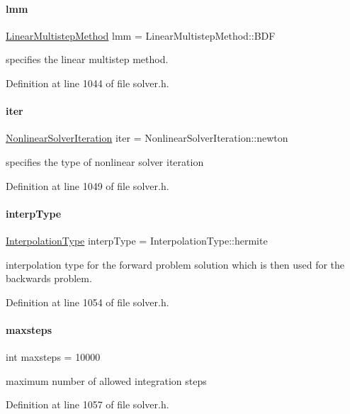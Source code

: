 \paragraph{\texorpdfstring{lmm}{lmm}}
{\footnotesize\ttfamily \mbox{\hyperlink{namespaceamici_a9ebe272482a8e073efe7078b7e96e8bc}{Linear\+Multistep\+Method}} lmm = Linear\+Multistep\+Method\+::\+B\+DF\hspace{0.3cm}{\ttfamily [protected]}}

specifies the linear multistep method. 

Definition at line 1044 of file solver.\+h.

\mbox{\label{classamici_1_1_solver_a0ef59d3f746d2ec0e3f126b7b9989f50}} 
\paragraph{\texorpdfstring{iter}{iter}}
{\footnotesize\ttfamily \mbox{\hyperlink{namespaceamici_a13388d34e4c35bb592c3e821c35cc923}{Nonlinear\+Solver\+Iteration}} iter = Nonlinear\+Solver\+Iteration\+::newton\hspace{0.3cm}{\ttfamily [protected]}}

specifies the type of nonlinear solver iteration 

Definition at line 1049 of file solver.\+h.

\mbox{\label{classamici_1_1_solver_a5a80193af5ca74a4a4e3da67a7e74a98}} 
\paragraph{\texorpdfstring{interp\+Type}{interpType}}
{\footnotesize\ttfamily \mbox{\hyperlink{namespaceamici_a8472f01c511d77bbfb981a46618ea1ea}{Interpolation\+Type}} interp\+Type = Interpolation\+Type\+::hermite\hspace{0.3cm}{\ttfamily [protected]}}

interpolation type for the forward problem solution which is then used for the backwards problem. 

Definition at line 1054 of file solver.\+h.

\mbox{\label{classamici_1_1_solver_a029415ebe024ac6281fd9f190aefb2ee}} 
\paragraph{\texorpdfstring{maxsteps}{maxsteps}}
{\footnotesize\ttfamily int maxsteps = 10000\hspace{0.3cm}{\ttfamily [protected]}}

maximum number of allowed integration steps 

Definition at line 1057 of file solver.\+h.

